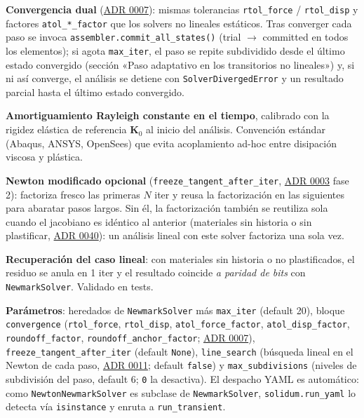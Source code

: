\documentclass[11pt,oneside]{report}
\begin{document}
\textbf{Convergencia dual} (\href{https://github.com/jretamav/solidum-fem/blob/main/docs/adr/0007-tolerancias-convergencia-solvers.md}{ADR 0007}): mismas tolerancias \texttt{rtol\_force} / \texttt{rtol\_disp} y factores \texttt{atol\_*\_factor} que los solvers no lineales estáticos. Tras converger cada paso se invoca \texttt{assembler.\allowbreak{}commit\_\allowbreak{}all\_\allowbreak{}states()} (trial \ensuremath{\to} committed en todos los elementos); si agota \texttt{max\_iter}, el paso se repite subdividido desde el último estado convergido (sección «Paso adaptativo en los transitorios no lineales») y, si ni así converge, el análisis se detiene con \texttt{SolverDivergedError} y un resultado parcial hasta el último estado convergido.

\textbf{Amortiguamiento Rayleigh constante en el tiempo}, calibrado con la rigidez elástica de referencia $\mathbf K_0$ al inicio del análisis. Convención estándar (Abaqus, ANSYS, OpenSees) que evita acoplamiento ad-hoc entre disipación viscosa y plástica.

\textbf{Newton modificado opcional} (\texttt{freeze\_\allowbreak{}tangent\_\allowbreak{}after\_\allowbreak{}iter}, \href{https://github.com/jretamav/solidum-fem/blob/main/docs/adr/0003-despachador-de-solver-algebraico.md}{ADR 0003} fase 2): factoriza fresco las primeras $N$ iter y reusa la factorización en las siguientes para abaratar pasos largos. Sin él, la factorización también se reutiliza sola cuando el jacobiano es idéntico al anterior (materiales sin historia o sin plastificar, \href{https://github.com/jretamav/solidum-fem/blob/main/docs/adr/0040-rendimiento-de-los-pasos-incrementales.md}{ADR 0040}): un análisis lineal con este solver factoriza una sola vez.

\textbf{Recuperación del caso lineal}: con materiales sin historia o no plastificados, el residuo se anula en 1 iter y el resultado coincide \textit{a paridad de bits} con \texttt{NewmarkSolver}. Validado en tests.

\textbf{Parámetros}: heredados de \texttt{NewmarkSolver} más \texttt{max\_iter} (default 20), bloque \texttt{convergence} (\texttt{rtol\_force}, \texttt{rtol\_disp}, \texttt{atol\_\allowbreak{}force\_\allowbreak{}factor}, \texttt{atol\_disp\_factor}, \texttt{roundoff\_factor}, \texttt{roundoff\_\allowbreak{}anchor\_\allowbreak{}factor}; \href{https://github.com/jretamav/solidum-fem/blob/main/docs/adr/0007-tolerancias-convergencia-solvers.md}{ADR 0007}), \texttt{freeze\_\allowbreak{}tangent\_\allowbreak{}after\_\allowbreak{}iter} (default \texttt{None}), \texttt{line\_search} (búsqueda lineal en el Newton de cada paso, \href{https://github.com/jretamav/solidum-fem/blob/main/docs/adr/0011-robustez-newton-line-search.md}{ADR 0011}; default \texttt{false}) y \texttt{max\_subdivisions} (niveles de subdivisión del paso, default 6; \texttt{0} la desactiva). El despacho YAML es automático: como \texttt{NewtonNewmarkSolver} es subclase de \texttt{NewmarkSolver}, \texttt{solidum.run\_yaml} lo detecta vía \texttt{isinstance} y enruta a \texttt{run\_transient}.
\end{document}
